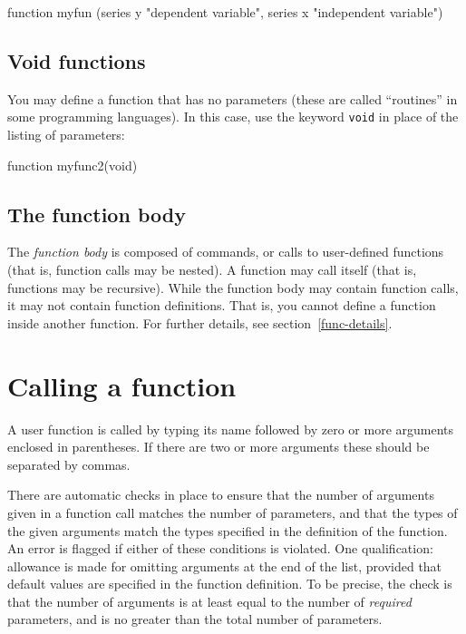 \begin{code}
function myfun (series y "dependent variable", 
                series x "independent variable")
\end{code} 

\subsection{Void functions}

You may define a function that has no parameters (these are called
``routines'' in some programming languages).  In this case,  
use the keyword \texttt{void} in place of the listing of parameters:
%    
\begin{code}
function myfunc2(void)
\end{code}


\subsection{The function body}
   
The \textsl{function body} is composed of  commands, or
calls to user-defined functions (that is, function calls may be
nested).  A function may call itself (that is, functions may be
recursive). While the function body may contain function calls, it may
not contain function definitions.  That is, you cannot define a
function inside another function.  For further details, see
section~\ref{func-details}.


\section{Calling a function}
\label{func-call}

A user function is called by typing its name followed by zero or more
arguments enclosed in parentheses.  If there are two or more arguments
these should be separated by commas.  

There are automatic checks in place to ensure that the number of
arguments given in a function call matches the number of parameters,
and that the types of the given arguments match the types specified in
the definition of the function.  An error is flagged if either of
these conditions is violated.  One qualification: allowance is made
for omitting arguments at the end of the list, provided that default
values are specified in the function definition.  To be precise, the
check is that the number of arguments is at least equal to the number
of \textit{required} parameters, and is no greater than the total
number of parameters.

